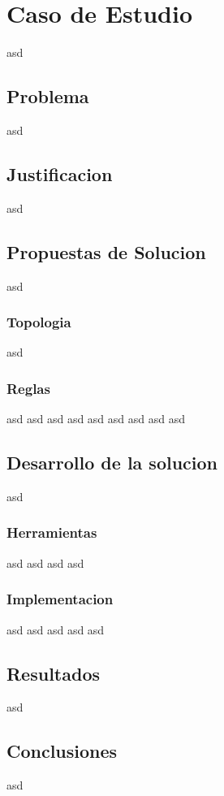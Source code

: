 \documentclass[12pt]{article}
\newcounter{subsubsubsection}[subsubsection]
\newcounter{subsubsubsubsection}[subsubsubsection]
\begin{document}
\section{Caso de Estudio}
asd
\subsection{Problema}
asd
\subsection{Justificacion}
asd
\subsection{Propuestas de Solucion}
asd
\subsubsection{Topologia}
asd
\subsubsection{Reglas}
asd
asd
asd
asd
asd
asd
asd
asd
asd

\subsection{Desarrollo de la solucion}
asd
\subsubsection{Herramientas}
asd
asd
asd
asd
\subsubsection{Implementacion}
asd
asd
asd
asd
asd

\subsection{Resultados}
asd
\subsection{Conclusiones}
asd






\end{document}
